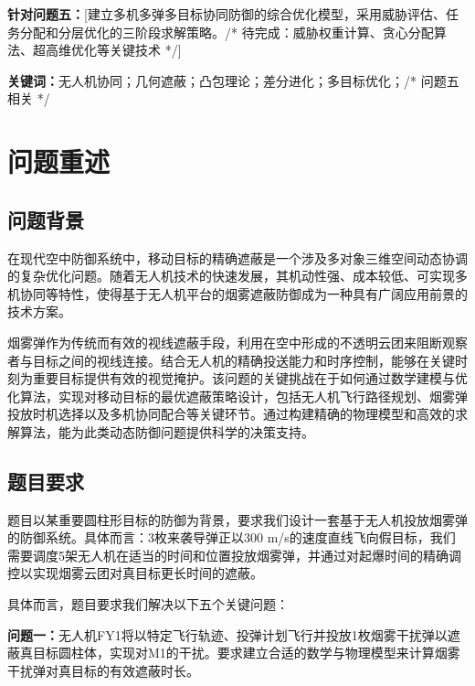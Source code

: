 \documentclass[fontset=SimSun]{ctexart}
\begin{document}
\textbf{针对问题五：}[建立多机多弹多目标协同防御的综合优化模型，采用威胁评估、任务分配和分层优化的三阶段求解策略。/* 待完成：威胁权重计算、贪心分配算法、超高维优化等关键技术 */]

\vfill

\noindent\hspace{2em}\textbf{关键词：}无人机协同；几何遮蔽；凸包理论；差分进化；多目标优化；/* 问题五相关 */


\newpage

\section{问题重述}

\subsection{问题背景}

在现代空中防御系统中，移动目标的精确遮蔽是一个涉及多对象三维空间动态协调的复杂优化问题。随着无人机技术的快速发展，其机动性强、成本较低、可实现多机协同等特性，使得基于无人机平台的烟雾遮蔽防御成为一种具有广阔应用前景的技术方案。

烟雾弹作为传统而有效的视线遮蔽手段，利用在空中形成的不透明云团来阻断观察者与目标之间的视线连接。结合无人机的精确投送能力和时序控制，能够在关键时刻为重要目标提供有效的视觉掩护。该问题的关键挑战在于如何通过数学建模与优化算法，实现对移动目标的最优遮蔽策略设计，包括无人机飞行路径规划、烟雾弹投放时机选择以及多机协同配合等关键环节。通过构建精确的物理模型和高效的求解算法，能为此类动态防御问题提供科学的决策支持。

\subsection{题目要求}

题目以某重要圆柱形目标的防御为背景，要求我们设计一套基于无人机投放烟雾弹的防御系统。具体而言：3枚来袭导弹正以300 m/s的速度直线飞向假目标，我们需要调度5架无人机在适当的时间和位置投放烟雾弹，并通过对起爆时间的精确调控以实现烟雾云团对真目标更长时间的遮蔽。

具体而言，题目要求我们解决以下五个关键问题：

\textbf{问题一：}无人机FY1将以特定飞行轨迹、投弹计划飞行并投放1枚烟雾干扰弹以遮蔽真目标圆柱体，实现对M1的干扰。要求建立合适的数学与物理模型来计算烟雾干扰弹对真目标的有效遮蔽时长。
\end{document}
